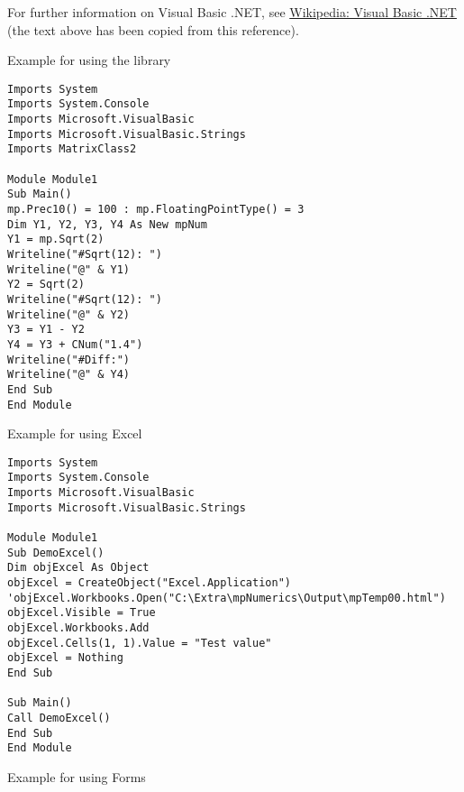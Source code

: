 \vpara
For further information on Visual Basic .NET, see \href{http://en.wikipedia.org/wiki/Visual_Basic_.NET}{Wikipedia: Visual Basic .NET} (the text above has been copied from this reference).


\vpara
Example for using the library


\begin{lstlisting}
Imports System
Imports System.Console
Imports Microsoft.VisualBasic
Imports Microsoft.VisualBasic.Strings
Imports MatrixClass2

Module Module1
Sub Main()
mp.Prec10() = 100 : mp.FloatingPointType() = 3
Dim Y1, Y2, Y3, Y4 As New mpNum
Y1 = mp.Sqrt(2)
Writeline("#Sqrt(12): ")
Writeline("@" & Y1)
Y2 = Sqrt(2)
Writeline("#Sqrt(12): ")
Writeline("@" & Y2)
Y3 = Y1 - Y2
Y4 = Y3 + CNum("1.4")
Writeline("#Diff:")
Writeline("@" & Y4)
End Sub
End Module
\end{lstlisting}


\vpara
Example for using Excel

\begin{lstlisting}
Imports System
Imports System.Console
Imports Microsoft.VisualBasic
Imports Microsoft.VisualBasic.Strings

Module Module1
Sub DemoExcel()
Dim objExcel As Object
objExcel = CreateObject("Excel.Application")
'objExcel.Workbooks.Open("C:\Extra\mpNumerics\Output\mpTemp00.html")
objExcel.Visible = True
objExcel.Workbooks.Add
objExcel.Cells(1, 1).Value = "Test value"
objExcel = Nothing
End Sub

Sub Main()
Call DemoExcel()
End Sub
End Module
\end{lstlisting}



\newpage
Example for using Forms


